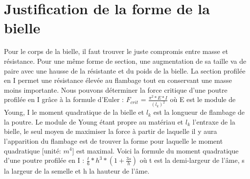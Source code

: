 \documentclass[a4paper,oneside,12pt]{report}
\begin{document}
\section{Justification de la forme de la bielle}

 Pour le corps de la bielle, il faut trouver le juste compromis entre masse et résistance. Pour une même forme de section, une augmentation de sa taille va de paire avec une hausse de la résistante et du poids de la bielle. La section profilée en I permet une résistance élevée au flambage tout en conservant une masse moins importante. Nous pouvons déterminer la force critique d'une poutre profilée en I grâce à la formule d'Euler : $F_{crit}$ = $\frac{\pi^2 *E*I}{(l_k)^2}$ où E est le module de Young, I le moment quadratique de la bielle et $l_k$ est la longueur de flambage de la poutre. Le module de Young étant propre au matériau et $l_k$ l'entraxe de la bielle, le seul moyen de maximiser la force à partir de laquelle il y aura l'apparition du flambage est de trouver la forme pour laquelle le moment quadratique [unité: $m^4$] est maximal. Voici la formule du moment quadratique d'une poutre profilée en I : $\frac{t}{6}*h^3*(1+\frac{3s}{h})$ où t est la demi-largeur de l'âme, s la largeur de la semelle et h la hauteur de l'âme.
\end{document}
